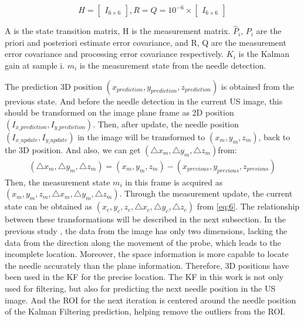 \documentclass[journal,article,submit,moreauthors,pdftex]{Definitions/mdpi}
\begin{document}
\begin{equation}
	H=
	\begin{bmatrix}
		I_{6\times6} 
	\end{bmatrix}
	,R=Q=10^{-6}\times
	\begin{bmatrix}
		I_{6\times6} 
	\end{bmatrix}
\end{equation}

A is the state transition matrix, H is the measurement matrix. ${\hat{P}_i}$, ${P_i}$ are the priori and posteriori estimate error covariance, and R, Q are the measurement error covariance and processing error covariance respectively.
${K_i}$ is the Kalman gain at sample i.
${m_i}$ is the measurement state from the needle detection.

The prediction 3D position ${(x_{prediction},y_{prediction},z_{prediction})}$ is obtained from the previous state.
And before the needle detection in the current US image, this should be transformed on the image plane frame as 2D position ${(I_{x\_prediction},I_{y\_prediction})}$.
Then, after update, the needle position ${(I_{x\_update},I_{y\_update})}$ in the image will be transformed to ${(x_{m},y_{m},z_{m})}$, back to the 3D position.
And also, we can get ${(\triangle x_{m},\triangle y_{m},\triangle z_{m})}$from:
\begin{equation}\label{eq:15}
\begin{aligned}
(\triangle x_{m},\triangle y_{m},\triangle z_{m})=(x_{m},y_{m},z_{m})-(x_{previous},y_{previous},z_{previous})
\end{aligned}
\end{equation}
Then, the measurement state ${m_i}$ in this frame is acquired as${(x_{m},y_{m},z_{m},\triangle x_{m},\triangle y_{m},\triangle z_{m})}$.
Through the measurement update, the current state can be obtained as ${(x_{c},y_{c},z_{c},\triangle x_{c},\triangle y_{c},\triangle z_{c})}$ from \ref{eq:6}.
The relationship between these transformations will be described in the next subsection.
In the previous study \cite{Waine2016a}, the data from the image has only two dimensions, lacking the data from the direction along the movement of the probe, which leads to the incomplete location.
Moreover, the space information is more capable to locate the needle accurately than the plane information.
Therefore, 3D positions have been used in the KF for the precise location.
The KF in this work is not only used for filtering, but also for predicting the next needle position in the US image.
And the ROI for the next iteration is centered around the needle position of the Kalman Filtering prediction, helping remove the outliers from the ROI.
\end{document}
